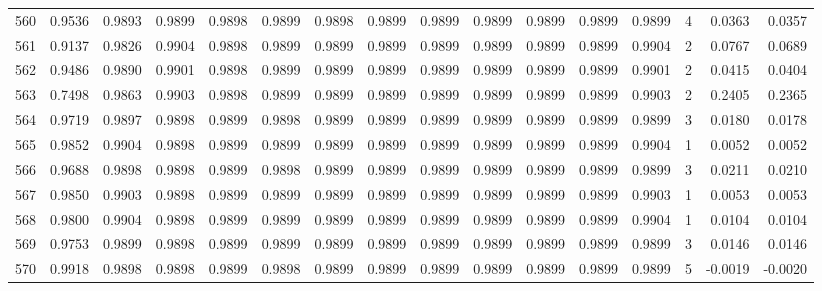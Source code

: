 \begin{tabular}{lrrrrrrrrrrrrrrr}
560 &      0.9536 &  0.9893 &  0.9899 &  0.9898 &  0.9899 &  0.9898 &  0.9899 &  0.9899 &  0.9899 &  0.9899 &   0.9899 &     0.9899 &      4 &                    0.0363 &                     0.0357 \\
561 &      0.9137 &  0.9826 &  0.9904 &  0.9898 &  0.9899 &  0.9899 &  0.9899 &  0.9899 &  0.9899 &  0.9899 &   0.9899 &     0.9904 &      2 &                    0.0767 &                     0.0689 \\
562 &      0.9486 &  0.9890 &  0.9901 &  0.9898 &  0.9899 &  0.9899 &  0.9899 &  0.9899 &  0.9899 &  0.9899 &   0.9899 &     0.9901 &      2 &                    0.0415 &                     0.0404 \\
563 &      0.7498 &  0.9863 &  0.9903 &  0.9898 &  0.9899 &  0.9899 &  0.9899 &  0.9899 &  0.9899 &  0.9899 &   0.9899 &     0.9903 &      2 &                    0.2405 &                     0.2365 \\
564 &      0.9719 &  0.9897 &  0.9898 &  0.9899 &  0.9898 &  0.9899 &  0.9899 &  0.9899 &  0.9899 &  0.9899 &   0.9899 &     0.9899 &      3 &                    0.0180 &                     0.0178 \\
565 &      0.9852 &  0.9904 &  0.9898 &  0.9899 &  0.9899 &  0.9899 &  0.9899 &  0.9899 &  0.9899 &  0.9899 &   0.9899 &     0.9904 &      1 &                    0.0052 &                     0.0052 \\
566 &      0.9688 &  0.9898 &  0.9898 &  0.9899 &  0.9898 &  0.9899 &  0.9899 &  0.9899 &  0.9899 &  0.9899 &   0.9899 &     0.9899 &      3 &                    0.0211 &                     0.0210 \\
567 &      0.9850 &  0.9903 &  0.9898 &  0.9899 &  0.9899 &  0.9899 &  0.9899 &  0.9899 &  0.9899 &  0.9899 &   0.9899 &     0.9903 &      1 &                    0.0053 &                     0.0053 \\
568 &      0.9800 &  0.9904 &  0.9898 &  0.9899 &  0.9899 &  0.9899 &  0.9899 &  0.9899 &  0.9899 &  0.9899 &   0.9899 &     0.9904 &      1 &                    0.0104 &                     0.0104 \\
569 &      0.9753 &  0.9899 &  0.9898 &  0.9899 &  0.9899 &  0.9899 &  0.9899 &  0.9899 &  0.9899 &  0.9899 &   0.9899 &     0.9899 &      3 &                    0.0146 &                     0.0146 \\
570 &      0.9918 &  0.9898 &  0.9898 &  0.9899 &  0.9898 &  0.9899 &  0.9899 &  0.9899 &  0.9899 &  0.9899 &   0.9899 &     0.9899 &      5 &                   -0.0019 &                    -0.0020 \\

\end{tabular}

